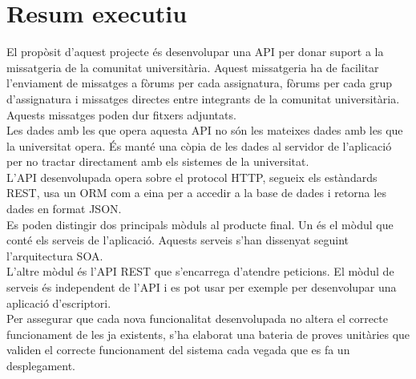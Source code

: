 
\chapter{Resum executiu}
El propòsit d'aquest projecte és desenvolupar una \ac{API} per donar suport a la missatgeria de la comunitat universitària. Aquest missatgeria ha de facilitar l'enviament de missatges a fòrums per cada assignatura, fòrums per cada grup d'assignatura i missatges directes entre integrants de la comunitat universitària. Aquests missatges poden dur fitxers adjuntats. \\

Les dades amb les que opera aquesta \ac{API} no són les mateixes dades amb les que la universitat opera. És manté una còpia de les dades al servidor de l'aplicació per no tractar directament amb els sistemes de la universitat.\\

L'\ac{API} desenvolupada opera sobre el protocol \ac{HTTP}, segueix els estàndards \ac{REST}, usa un \ac{ORM} com a eina per a accedir a la base de dades i retorna les dades en format \ac{JSON}. \\

Es poden distingir dos principals mòduls al producte final. Un és el mòdul que conté els serveis de l'aplicació. Aquests serveis s'han dissenyat seguint l'arquitectura \ac{SOA}. \\

L'altre mòdul és l'\ac{API} \ac{REST} que s'encarrega d'atendre peticions. El mòdul de serveis és independent de l'\ac{API} i es pot usar per exemple per desenvolupar una aplicació d'escriptori.\\

Per assegurar que cada nova funcionalitat desenvolupada no altera el correcte funcionament de les ja existents, s'ha elaborat una bateria de proves unitàries que validen el correcte funcionament del sistema cada vegada que es fa un desplegament.




